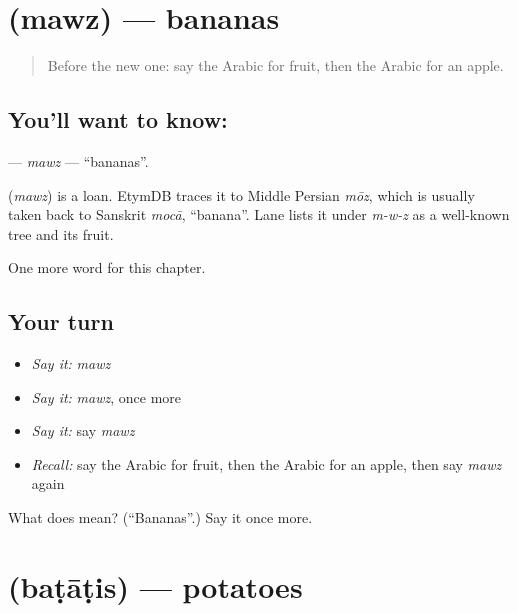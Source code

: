 \section[\texorpdfstring{\ar{موز} (mawz)}{موز (mawz)}]{ (mawz) — bananas}

\label{lesson:AR-C66-mawz}



\begin{quote}
Before the new one: say the Arabic for fruit, then the Arabic for an apple.
\end{quote}

\subsection*{You'll want to know: }
\textbf{} — \emph{mawz} — \textquotedblleft{}bananas\textquotedblright{}.

\begin{cousinweb}
\textbf{} (\emph{mawz}) is a loan. EtymDB traces it to Middle Persian \emph{mōz}, which is usually taken back to Sanskrit \emph{mocā}, \textquotedblleft{}banana\textquotedblright{}. Lane lists it under \emph{m-w-z} as a well-known tree and its fruit.
\end{cousinweb}

\begin{grammarlens}[title={What you've built}]
One more word for this chapter.
\end{grammarlens}

\subsection*{Your turn}
\begin{itemize}
\raggedright
  \item \emph{Say it:} \emph{mawz}
  \item \emph{Say it:} \emph{mawz}, once more
  \item \emph{Say it:} say \emph{mawz}
  \item \emph{Recall:} say the Arabic for fruit, then the Arabic for an apple, then say \emph{mawz} again
\end{itemize}

\begin{tcolorbox}[breakable,colback=teal!4,colframe=teal!35!black,title={Before you move on}]
What does  mean? (\textquotedblleft{}Bananas\textquotedblright{}.) Say it once more.
\end{tcolorbox}
\section[\texorpdfstring{\ar{بطاطس} (baṭāṭis)}{بطاطس (baṭāṭis)}]{ (baṭāṭis) — potatoes}

